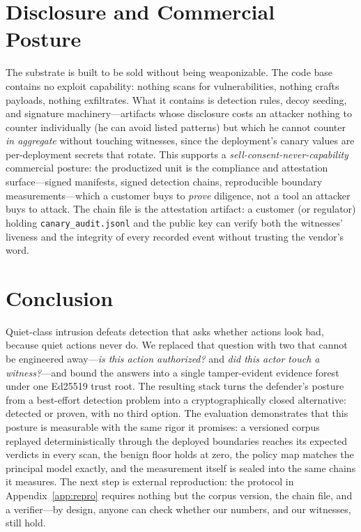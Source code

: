 \documentclass[11pt,a4paper]{article}
\newcommand{\code}[1]{\texttt{#1}}
\begin{document}
\needspace{0.22\textheight}
\section{Disclosure and Commercial Posture}\label{sec:disclosure}

The substrate is built to be sold without being weaponizable. The code
base contains no exploit capability: nothing scans for vulnerabilities,
nothing crafts payloads, nothing exfiltrates. What it contains is
detection rules, decoy seeding, and signature machinery---artifacts whose
disclosure costs an attacker nothing to counter individually (he can
avoid listed patterns) but which he cannot counter \emph{in aggregate}
without touching witnesses, since the deployment's canary values are
per-deployment secrets that rotate. This supports a
\emph{sell-consent-never-capability} commercial posture: the productized
unit is the compliance and attestation surface---signed manifests, signed
detection chains, reproducible boundary measurements---which a customer
buys to \emph{prove} diligence, not a tool an attacker buys to attack.
The chain file is the attestation artifact: a customer (or regulator)
holding \code{canary\_audit.jsonl} and the public key can verify both the
witnesses' liveness and the integrity of every recorded event without
trusting the vendor's word.

\needspace{0.22\textheight}
\section{Conclusion}\label{sec:conclusion}

Quiet-class intrusion defeats detection that asks whether actions look
bad, because quiet actions never do. We replaced that question with two
that cannot be engineered away---\emph{is this action authorized?} and
\emph{did this actor touch a witness?}---and bound the answers into a
single tamper-evident evidence forest under one Ed25519 trust root. The
resulting stack turns the defender's posture from a best-effort detection
problem into a cryptographically closed alternative: detected or proven,
with no third option. The evaluation demonstrates that this posture is
measurable with the same rigor it promises: a versioned corpus replayed
deterministically through the deployed boundaries reaches its expected
verdicts in every scan, the benign floor holds at zero, the policy map
matches the principal model exactly, and the measurement itself is sealed
into the same chains it measures. The next step is external reproduction:
the protocol in Appendix~\ref{app:repro} requires nothing but the corpus
version, the chain file, and a verifier---by design, anyone can check
whether our numbers, and our witnesses, still hold.
\end{document}
